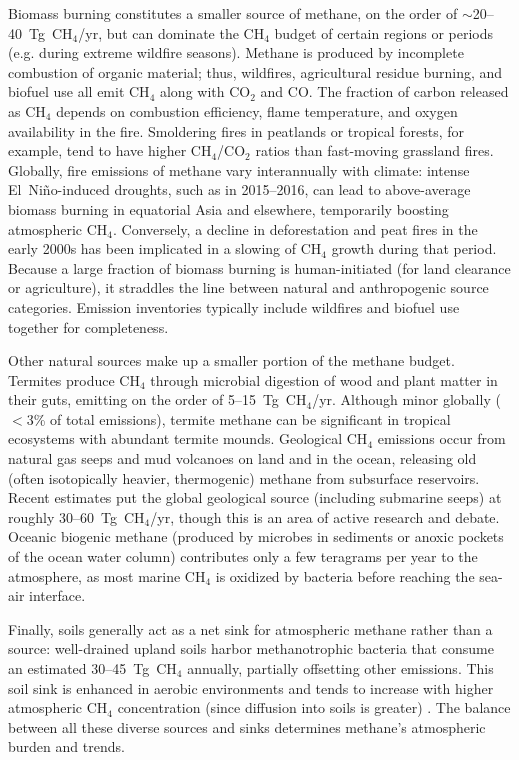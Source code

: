 Biomass burning constitutes a smaller source of methane, on the order of $\sim$20--40~Tg~CH$_4$/yr, but can dominate the CH$_4$ budget of certain regions or periods (e.g. during extreme wildfire seasons). Methane is produced by incomplete combustion of organic material; thus, wildfires, agricultural residue burning, and biofuel use all emit CH$_4$ along with CO$_2$ and CO. The fraction of carbon released as CH$_4$ depends on combustion efficiency, flame temperature, and oxygen availability in the fire. Smoldering fires in peatlands or tropical forests, for example, tend to have higher CH$_4$/CO$_2$ ratios than fast-moving grassland fires. Globally, fire emissions of methane vary interannually with climate: intense El~Ni{\~n}o-induced droughts, such as in 2015--2016, can lead to above-average biomass burning in equatorial Asia and elsewhere, temporarily boosting atmospheric CH$_4$. Conversely, a decline in deforestation and peat fires in the early 2000s has been implicated in a slowing of CH$_4$ growth during that period. Because a large fraction of biomass burning is human-initiated (for land clearance or agriculture), it straddles the line between natural and anthropogenic source categories. Emission inventories typically include wildfires and biofuel use together for completeness.

Other natural sources make up a smaller portion of the methane budget. Termites produce CH$_4$ through microbial digestion of wood and plant matter in their guts, emitting on the order of 5--15~Tg~CH$_4$/yr. Although minor globally ($<$3\% of total emissions), termite methane can be significant in tropical ecosystems with abundant termite mounds. Geological CH$_4$ emissions occur from natural gas seeps and mud volcanoes on land and in the ocean, releasing old (often isotopically heavier, thermogenic) methane from subsurface reservoirs. Recent estimates put the global geological source (including submarine seeps) at roughly 30--60~Tg~CH$_4$/yr, though this is an area of active research and debate. Oceanic biogenic methane (produced by microbes in sediments or anoxic pockets of the ocean water column) contributes only a few teragrams per year to the atmosphere, as most marine CH$_4$ is oxidized by bacteria before reaching the sea-air interface.

Finally, soils generally act as a net sink for atmospheric methane rather than a source: well-drained upland soils harbor methanotrophic bacteria that consume an estimated 30--45~Tg~CH$_4$ annually, partially offsetting other emissions. This soil sink is enhanced in aerobic environments and tends to increase with higher atmospheric CH$_4$ concentration (since diffusion into soils is greater) \cite{global_methane_budget}. The balance between all these diverse sources and sinks determines methane's atmospheric burden and trends.

